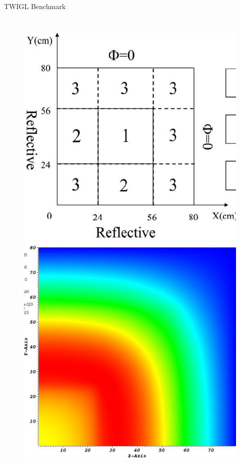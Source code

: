 \documentclass[8pt,xcolor=dvipnames]{beamer}
\begin{document}
\begin{frame}{TWIGL Benchmark}

\begin{columns}
\column{\dimexpr\paperwidth-10pt}
\begin{figure}
\includegraphics[width=0.5\linewidth]{figures/twigl_geom.png}
\includegraphics[width=0.5\linewidth]{figures/ndiff_ramp_flux.jpg}
\end{figure}
\end{columns}

\end{frame}
\end{document}
